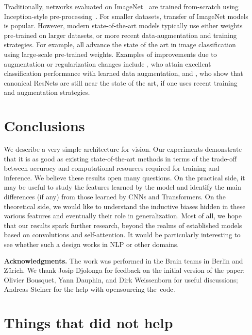 \documentclass{article}
\begin{document}
Traditionally, networks evaluated on ImageNet~\citep{deng2009-imagenet} are trained from-scratch using Inception-style pre-processing~\citep{inception}.
For smaller datasets, transfer of ImageNet models is popular.
However, modern state-of-the-art models typically use either weights pre-trained on larger datasets, or more recent data-augmentation and training strategies.
For example, \citet{Dosovitskiy2021,kolesnikov2020-bit,mahajan2018,pham2020meta,xie2020-noisystudent} all advance the state of the art in image classification using large-scale pre-trained weights.
Examples of improvements due to augmentation or regularization changes include \citet{autoaugment}, who attain excellent classification performance with learned data augmentation, and \citet{bello2021revisiting}, who show that canonical ResNets are still near the state of the art, if one uses recent training and augmentation strategies.

\section{Conclusions}
We describe a very simple architecture for vision.
Our experiments demonstrate that it is as good as existing state-of-the-art methods in terms of the trade-off between accuracy and computational resources required for training and inference.
We believe these results open many questions.
On the practical side, it may be useful to study the features learned by the model and identify the main differences (if any) from those learned by CNNs and Transformers.
On the theoretical side, we would like to understand the inductive biases hidden in these various features and eventually their role in generalization.
Most of all, we hope that our results spark further research, beyond the realms of established models based on convolutions and self-attention.
It would be particularly interesting to see whether such a design works in NLP or other domains.

\textbf{Acknowledgments.} The work was performed in the Brain teams in Berlin and Z\"urich.
We thank Josip Djolonga for feedback on the initial version of the paper; 
Olivier Bousquet, Yann Dauphin, and Dirk Weissenborn for useful discussions;
Andreas Steiner for the help with opensourcing the~code.
 

  

\appendix
\section{Things that did not help}
\end{document}
